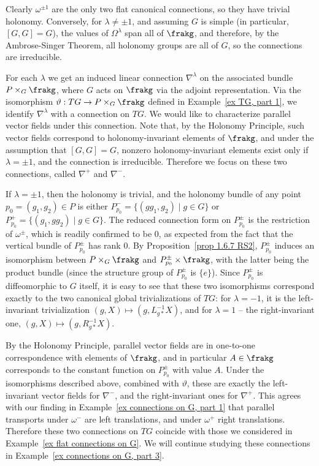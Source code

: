 \begin{example}\label{ex connections on G, part 2}
    Clearly $\omega^{\pm 1}$ are the only two flat canonical connections, so they have trivial holonomy. Conversely, for $\lambda\neq\pm 1$, and assuming $G$ is simple (in particular, $[G,G]=G$), the values of $\Omega^\lambda$ span all of $\frakg$, and therefore, by the Ambrose-Singer Theorem, all holonomy groups are all of $G$, so the connections are irreducible.

    For each $\lambda$ we get an induced linear connection $\nabla^\lambda$ on the associated bundle $P\times_G \frakg$, where $G$ acts on $\frakg$ via the adjoint representation. Via the isomorphism $\vartheta:TG\to P\times_G \frakg$ defined in Example~\ref{ex TG, part 1}, we identify $\nabla^\lambda$ with a connection on $TG$. We would like to characterize parallel vector fields under this connection. Note that, by the Holonomy Principle, such vector fields correspond to holonomy-invariant elements of $\frakg$, and under the assumption that $[G,G]=G$, nonzero holonomy-invariant elements exist only if $\lambda=\pm 1$, and the connection is irreducible. Therefore we focus on these two connections, called $\nabla^+$ and $\nabla^-$.
    
    If $\lambda=\pm 1$, then the holonomy is trivial, and the holonomy bundle of any point $p_0=(g_1,g_2)\in P$ is either $P^{-}_{p_0}=\{(gg_1,g_2)\mid g\in G\}$ or $P^{+}_{p_0}=\{(g_1,gg_2)\mid g\in G\}$. The reduced connection form on $P_{p_0}^{\pm}$ is the restriction of $\omega^{\pm}$, which is readily confirmed to be $0$, as expected from the fact that the vertical bundle of $P_{p_0}^{\pm}$ has rank $0$. By Proposition~\ref{prop 1.6.7 RS2}, $P_{p_0}^{\pm}$ induces an isomorphism between $P\times_G\frakg$ and $P_{p_0}^{\pm}\times\frakg$, with the latter being the product bundle (since the structure group of $P_{p_0}^{\pm}$ is $\{e\}$). Since $P_{p_0}^{\pm}$ is diffeomorphic to $G$ itself, it is easy to see that these two isomorphisms correspond exactly to the two canonical global trivializations of $TG$: for $\lambda=-1$, it is the left-invariant trivialization $(g,X)\mapsto (g,L_{g\ast}^{-1}X)$, and for $\lambda=1$ -- the right-invariant one, $(g,X)\mapsto (g,R_{g\ast}^{-1}X)$. 

    By the Holonomy Principle, parallel vector fields are in one-to-one correspondence with elements of $\frakg$, and in particular $A\in \frakg$ corresponds to the constant function on $P_{p_0}^{\pm}$ with value $A$. Under the isomorphisms described above, combined with $\vartheta$, these are exactly the left-invariant vector fields for $\nabla^-$, and the right-invariant ones for $\nabla^+$. This agrees with our finding in Example~\ref{ex connections on G, part 1} that parallel transports under $\omega^-$ are left translations, and under $\omega^+$ right translations. Therefore these two connections on $TG$ coincide with those we considered in Example~\ref{ex flat connections on G}. We will continue studying these connections in Example~\ref{ex connections on G, part 3}.
\end{example}








